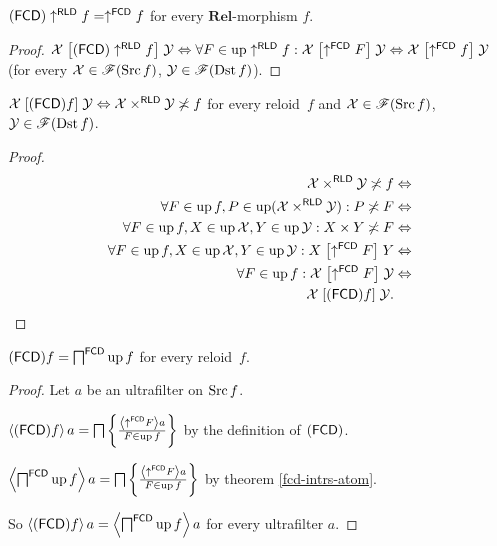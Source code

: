 \begin{prop}
\label{fcd-discr}$(\mathsf{FCD})\uparrow^{\mathsf{RLD}}f=\uparrow^{\mathsf{FCD}}f$
for every $\mathbf{Rel}$-morphism $f$.\end{prop}
\begin{proof}
$\mathcal{X}\mathrel{\left[(\mathsf{FCD})\uparrow^{\mathsf{RLD}}f\right]}\mathcal{Y}\Leftrightarrow\forall F\in\operatorname{up}\uparrow^{\mathsf{RLD}}f:\mathcal{X}\mathrel{\left[\uparrow^{\mathsf{FCD}}F\right]}\mathcal{Y}\Leftrightarrow\mathcal{X}\mathrel{\left[\uparrow^{\mathsf{FCD}}f\right]}\mathcal{Y}$
(for every $\mathcal{X}\in\mathscr{F}(\operatorname{Src} f)$, $\mathcal{Y}\in\mathscr{F}(\operatorname{Dst} f)$).\end{proof}
\begin{thm}
$\mathcal{X}\mathrel{\left[(\mathsf{FCD}) f\right]}\mathcal{Y}\Leftrightarrow\mathcal{X}\times^{\mathsf{RLD}}\mathcal{Y}\not\asymp f$
for every reloid~$f$ and $\mathcal{X}\in\mathscr{F}(\operatorname{Src} f)$,
$\mathcal{Y}\in\mathscr{F}(\operatorname{Dst} f)$.\end{thm}
\begin{proof}
~
\begin{align*}
\mathcal{X}\times^{\mathsf{RLD}}\mathcal{Y}\not\asymp f & \Leftrightarrow\\
\forall F\in\operatorname{up} f,P\in\operatorname{up}(\mathcal{X}\times^{\mathsf{RLD}}\mathcal{Y}):P\not\asymp F & \Leftrightarrow\\
\forall F\in\operatorname{up} f,X\in\operatorname{up}\mathcal{X},Y\in\operatorname{up}\mathcal{Y}:X\times Y\not\asymp F & \Leftrightarrow\\
\forall F\in\operatorname{up} f,X\in\operatorname{up}\mathcal{X},Y\in\operatorname{up}\mathcal{Y}:X\mathrel{\left[\uparrow^{\mathsf{FCD}}F\right]}Y & \Leftrightarrow\\
\forall F\in\operatorname{up} f:\mathcal{X}\mathrel{\left[\uparrow^{\mathsf{FCD}}F\right]}\mathcal{Y} & \Leftrightarrow\\
\mathcal{X}\mathrel{\left[(\mathsf{FCD}) f\right]}\mathcal{Y}.
\end{align*}
\end{proof}
\begin{thm}
\label{fcd-as-meet}$(\mathsf{FCD}) f=\bigsqcap^{\mathsf{FCD}}\operatorname{up} f$ for
every reloid~$f$.\end{thm}
\begin{proof}
Let $a$ be an ultrafilter on $\operatorname{Src} f$.

$\left\langle (\mathsf{FCD}) f\right\rangle a=\bigsqcap\left\{ \frac{\left\langle \uparrow^{\mathsf{FCD}}F\right\rangle a}{F\in\operatorname{up} f}\right\}$
by the definition of $(\mathsf{FCD})$.

$\left\langle \bigsqcap^{\mathsf{FCD}}\operatorname{up} f\right\rangle a=\bigsqcap\left\{ \frac{\left\langle \uparrow^{\mathsf{FCD}}F\right\rangle a}{F\in\operatorname{up} f}\right\}$
by theorem \ref{fcd-intrs-atom}.

So $\left\langle (\mathsf{FCD}) f\right\rangle a=\left\langle \bigsqcap^{\mathsf{FCD}}\operatorname{up} f\right\rangle a$ for
every ultrafilter $a$.\end{proof}
